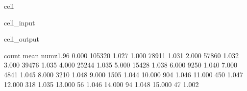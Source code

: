 \documentclass[letterpaper,10pt,english]{jupyterBook}
\begin{document}
\begin{sphinxuseclass}{cell}\begin{sphinxVerbatimInput}

\begin{sphinxuseclass}{cell_input}
\begin{sphinxVerbatim}[commandchars=\\\{\}]
   
\PYG{p}{[}\PYG{p}{]}\PYG{p}{[}\PYG{p}{]}
\PYG{p}{[}\PYG{p}{]}   
\end{sphinxVerbatim}

\end{sphinxuseclass}\end{sphinxVerbatimInput}
\begin{sphinxVerbatimOutput}

\begin{sphinxuseclass}{cell_output}
\begin{sphinxVerbatim}[commandchars=\\\{\}]
             count  mean
num\PYGZus{}z\PYGZgt{}1.96              
0.000       105320 1.027
1.000        78911 1.031
2.000        57860 1.032
3.000        39476 1.035
4.000        25244 1.035
5.000        15428 1.038
6.000         9250 1.040
7.000         4841 1.045
8.000         3210 1.048
9.000         1505 1.044
10.000         904 1.046
11.000         450 1.047
12.000         318 1.035
13.000          56 1.046
14.000          94 1.048
15.000          47 1.002
\end{sphinxVerbatim}


\end{sphinxuseclass}
\end{sphinxVerbatimOutput}
\end{sphinxuseclass}
\end{document}
